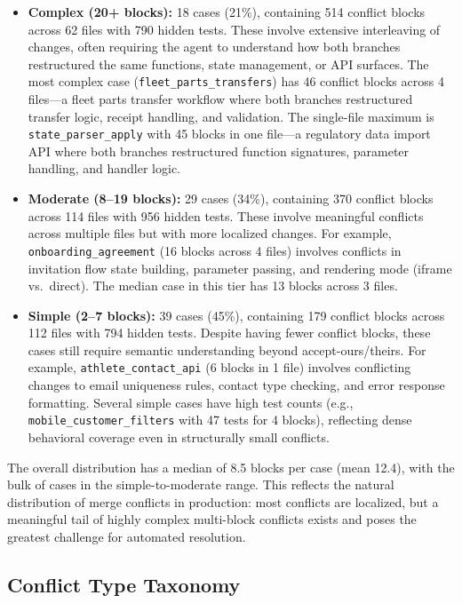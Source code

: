 \documentclass[11pt,letterpaper]{article}
\begin{document}
\begin{itemize}[leftmargin=2em]
\item \textbf{Complex (20+ blocks):} 18 cases (21\%), containing 514 conflict blocks across 62 files with 790 hidden tests. These involve extensive interleaving of changes, often requiring the agent to understand how both branches restructured the same functions, state management, or API surfaces. The most complex case (\texttt{fleet\_parts\_transfers}) has 46 conflict blocks across 4 files---a fleet parts transfer workflow where both branches restructured transfer logic, receipt handling, and validation. The single-file maximum is \texttt{state\_parser\_apply} with 45 blocks in one file---a regulatory data import API where both branches restructured function signatures, parameter handling, and handler logic.

\item \textbf{Moderate (8--19 blocks):} 29 cases (34\%), containing 370 conflict blocks across 114 files with 956 hidden tests. These involve meaningful conflicts across multiple files but with more localized changes. For example, \texttt{onboarding\_agreement} (16 blocks across 4 files) involves conflicts in invitation flow state building, parameter passing, and rendering mode (iframe vs.\ direct). The median case in this tier has 13 blocks across 3 files.

\item \textbf{Simple (2--7 blocks):} 39 cases (45\%), containing 179 conflict blocks across 112 files with 794 hidden tests. Despite having fewer conflict blocks, these cases still require semantic understanding beyond accept-ours/theirs. For example, \texttt{athlete\_contact\_api} (6 blocks in 1 file) involves conflicting changes to email uniqueness rules, contact type checking, and error response formatting. Several simple cases have high test counts (e.g., \texttt{mobile\_customer\_filters} with 47 tests for 4 blocks), reflecting dense behavioral coverage even in structurally small conflicts.
\end{itemize}

The overall distribution has a median of 8.5 blocks per case (mean 12.4), with the bulk of cases in the simple-to-moderate range. This reflects the natural distribution of merge conflicts in production: most conflicts are localized, but a meaningful tail of highly complex multi-block conflicts exists and poses the greatest challenge for automated resolution.

\subsection{Conflict Type Taxonomy}
\end{document}
